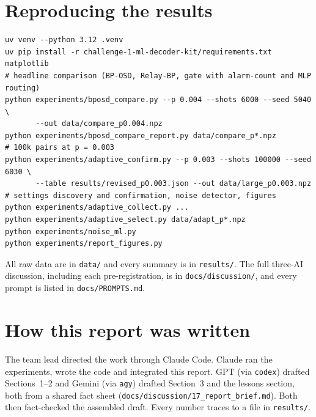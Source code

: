 \documentclass[11pt]{article}
\begin{document}
\appendix
\section{Reproducing the results}
\begin{small}
\begin{verbatim}
uv venv --python 3.12 .venv
uv pip install -r challenge-1-ml-decoder-kit/requirements.txt matplotlib
# headline comparison (BP-OSD, Relay-BP, gate with alarm-count and MLP routing)
python experiments/bposd_compare.py --p 0.004 --shots 6000 --seed 5040 \
       --out data/compare_p0.004.npz
python experiments/bposd_compare_report.py data/compare_p*.npz
# 100k pairs at p = 0.003
python experiments/adaptive_confirm.py --p 0.003 --shots 100000 --seed 6030 \
       --table results/revised_p0.003.json --out data/large_p0.003.npz
# settings discovery and confirmation, noise detector, figures
python experiments/adaptive_collect.py ...
python experiments/adaptive_select.py data/adapt_p*.npz
python experiments/noise_ml.py
python experiments/report_figures.py
\end{verbatim}
\end{small}
All raw data are in \texttt{data/} and every summary is in \texttt{results/}. The full three-AI discussion, including
each pre-registration, is in \texttt{docs/discussion/}, and every prompt is listed in \texttt{docs/PROMPTS.md}.

\section{How this report was written}
The team lead directed the work through Claude Code. Claude ran the experiments, wrote the code and integrated this report.
GPT (via \texttt{codex}) drafted Sections~1--2 and Gemini (via \texttt{agy}) drafted Section~3 and the lessons section, both from a
shared fact sheet (\texttt{docs/discussion/17\_report\_brief.md}). Both then fact-checked the assembled draft. Every number traces
to a file in \texttt{results/}.
\end{document}
